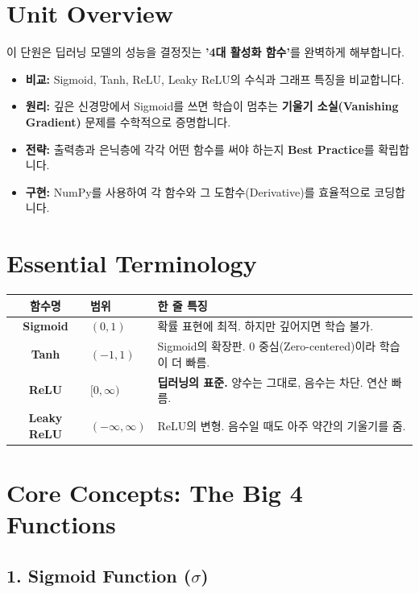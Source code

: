 \documentclass[11pt,a4paper]{book}
\theoremstyle{definition}
\begin{document}
\section{Unit Overview}
\begin{summarybox}[title={핵심 목표}]
이 단원은 딥러닝 모델의 성능을 결정짓는 \textbf{'4대 활성화 함수'}를 완벽하게 해부합니다.
\begin{itemize}
    \item \textbf{비교:} Sigmoid, Tanh, ReLU, Leaky ReLU의 수식과 그래프 특징을 비교합니다.
    \item \textbf{원리:} 깊은 신경망에서 Sigmoid를 쓰면 학습이 멈추는 \textbf{기울기 소실(Vanishing Gradient)} 문제를 수학적으로 증명합니다.
    \item \textbf{전략:} 출력층과 은닉층에 각각 어떤 함수를 써야 하는지 \textbf{Best Practice}를 확립합니다.
    \item \textbf{구현:} NumPy를 사용하여 각 함수와 그 도함수(Derivative)를 효율적으로 코딩합니다.
  \end{itemize}
\end{summarybox}

\section{Essential Terminology}
\begin{center}
\begin{tabular}{|c|l|l|}
\hline
\textbf{함수명} & \textbf{범위} & \textbf{한 줄 특징} \\ \hline
\textbf{Sigmoid} & $(0, 1)$ & 확률 표현에 최적. 하지만 깊어지면 학습 불가. \\ \hline
\textbf{Tanh} & $(-1, 1)$ & Sigmoid의 확장판. 0 중심(Zero-centered)이라 학습이 더 빠름. \\ \hline
\textbf{ReLU} & $[0, \infty)$ & \textbf{딥러닝의 표준.} 양수는 그대로, 음수는 차단. 연산 빠름. \\ \hline
\textbf{Leaky ReLU} & $(-\infty, \infty)$ & ReLU의 변형. 음수일 때도 아주 약간의 기울기를 줌. \\ \hline
\end{tabular}
\end{center}

\section{Core Concepts: The Big 4 Functions}

\subsection{1. Sigmoid Function ($\sigma$)}
\end{document}
